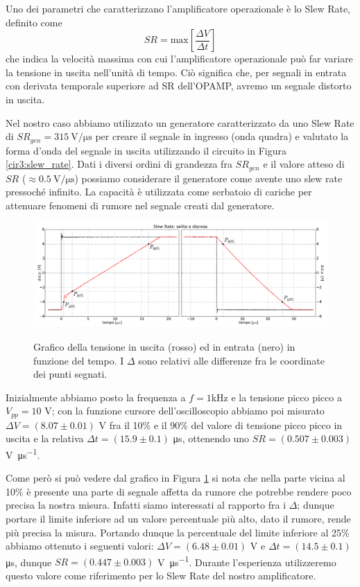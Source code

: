 Uno dei parametri che caratterizzano l'amplificatore operazionale è lo Slew Rate, definito come
$$SR = \mathrm{max}\left[\frac{\Delta V}{\Delta t}\right]$$
che indica la velocità massima con cui l'amplificatore operazionale può far variare la tensione in uscita nell'unità di tempo. Ciò significa che, per segnali in entrata con derivata temporale superiore ad SR dell'OPAMP, avremo un segnale distorto in uscita.

Nel nostro caso abbiamo utilizzato un generatore caratterizzato da uno Slew Rate di $SR_{gen}=\SI{315}{\volt\per\micro\second}$ per creare il segnale in ingresso (onda quadra) e valutato la forma d'onda del segnale in uscita utilizzando il circuito in Figura \ref{cir3:slew_rate}.
Dati i diversi ordini di grandezza fra $SR_{gen}$ e il valore atteso di $SR$ ($\approx \SI{0.5}{\volt\per\micro\second} $) possiamo considerare il generatore come avente uno slew rate pressoché infinito.
La capacità è utilizzata come serbatoio di cariche per attenuare fenomeni di rumore nel segnale creati dal generatore.

\begin{figure}[ht]
 \centering
   {\includegraphics[width=\textwidth]{../E03/latex/sr_uad.pdf}}
 \caption{Grafico della tensione in uscita (rosso) ed in entrata (nero) in funzione del tempo. I $\Delta$ sono relativi alle differenze fra le coordinate dei punti segnati.}
 \label{gr3:slew_rate}
\end{figure}

Inizialmente abbiamo posto la frequenza a $f=1$\si{\kilo\hertz} e la tensione picco picco a $V_{pp}=10$ \si{\volt}; con la funzione cursore dell'oscilloscopio abbiamo poi misurato $\Delta V = (8.07 \pm 0.01)$ \si{\volt} fra il 10\% e il 90\% del valore di tensione picco picco in uscita e la relativa $\Delta t = (15.9 \pm 0.1)$ \si{\micro\second}, ottenendo uno $SR=(0.507 \pm 0.003)$ \si{\volt\per\micro\second}.

Come però si può vedere dal grafico in Figura \ref{gr3:slew_rate} si nota che nella parte vicina al 10\% è presente una parte di segnale affetta da rumore che potrebbe rendere poco precisa la nostra misura. Infatti siamo interessati al rapporto fra i $\Delta$; dunque portare il limite inferiore ad un valore percentuale più alto, dato il rumore, rende più precisa la misura. Portando dunque la percentuale del limite inferiore al 25\% abbiamo ottenuto i seguenti valori: $\Delta V = (6.48 \pm 0.01)$ \si{\volt} e $\Delta t = (14.5 \pm 0.1)$ \si{\micro\second}, dunque $SR = (0.447 \pm 0.003)$ \si{\volt\per\micro\second}. Durante l'esperienza utilizzeremo questo valore come riferimento per lo Slew Rate del nostro amplificatore.

